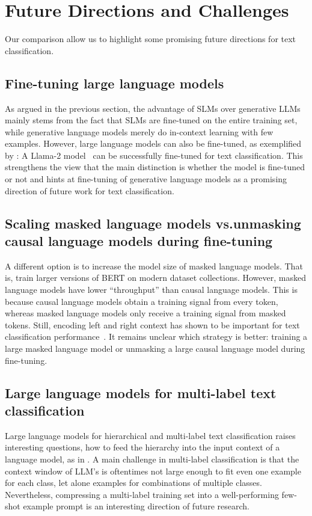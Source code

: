 \documentclass[acmsmall,nonacm]{acmart}
\newcommand{\GenLMs}{generative language models\xspace}
\newcommand{\SLMs}{SLMs\xspace}
\newcommand{\LLMs}{LLMs\xspace}
\begin{document}
\section{Future Directions and Challenges}\label{sec:future}
Our comparison allow us to highlight some promising future directions for text classification.

\subsection{Fine-tuning large language models}
As argued in the previous section, the advantage of \SLMs over generative \LLMs mainly stems from the fact that \SLMs are fine-tuned on the entire training set, while \GenLMs merely do in-context learning with few examples. 
However, large language models can also be fine-tuned, as exemplified by \cite{li2023label}: A Llama-2 model~\cite{touvronLlamaOpenFoundation2023}  can be successfully fine-tuned for text classification.
This strengthens the view that the main distinction is whether the model is fine-tuned or not and hints at fine-tuning of \GenLMs as a promising direction of future work for text classification.

\subsection{Scaling masked language models vs.\@ unmasking causal language models during fine-tuning}
A different option is to increase the model size of masked language models. That is, train larger versions of BERT on modern dataset collections. However, masked language models have lower ``throughput'' than causal language models. This is because causal language models obtain a training signal from every token, whereas masked language models only receive a training signal from masked tokens. Still, encoding left and right context has shown to be important for text classification performance~\cite{li2023label}.
It remains unclear which strategy is better: training a large masked language model or unmasking a large causal language model during fine-tuning.

\subsection{Large language models for multi-label text classification}

Large language models for hierarchical and multi-label text classification raises interesting questions, how to feed the hierarchy into the input context of a language model, \eg as in \cite{fatemi2024talk}.
A main challenge in multi-label classification is that the context window of LLM's is oftentimes not large enough to fit even one example for each class, let alone examples for combinations of multiple classes.
Nevertheless, compressing a multi-label training set into a well-performing few-shot example prompt is an interesting direction of future research.
\end{document}
